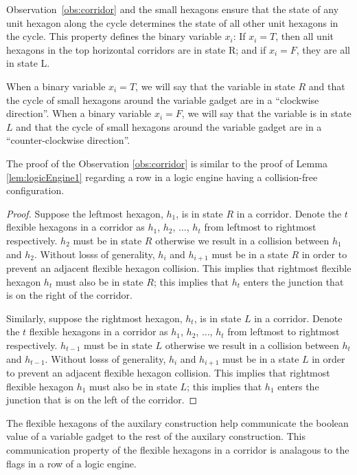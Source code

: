 Observation~\ref{obs:corridor} and the small hexagons ensure that the state of any unit hexagon along the cycle determines the state of all other unit hexagons in the cycle. 
This property defines the binary variable $x_i$: If $x_i=T$, then all unit hexagons in the top horizontal corridors are in state R; and if $x_i=F$, they are all in state L.

When a binary variable $x_i = T$, we will say that the variable in state $R$ and that the cycle of small hexagons around the variable gadget are in a ``clockwise direction''.
When a binary variable $x_i = F$, we will say that the variable is in state $L$ and that the cycle of small hexagons around the variable gadget are in a ``counter-clockwise direction''. 

The proof of the Observation \ref{obs:corridor} is similar to the proof of Lemma \ref{lem:logicEngine1} regarding a row in a logic engine having a collision-free configuration.
\begin{proof}
Suppose the leftmost hexagon, $h_1$, is in state $R$ in a corridor.
Denote the $t$ flexible hexagons in a corridor as $h_1$, $h_2$, $\ldots$, $h_t$ from leftmost to rightmost respectively.
$h_2$ must be in state $R$ otherwise we result in a collision between $h_1$ and $h_2$.
Without losss of generality, $h_i$ and $h_{i+1}$ must be in a state $R$ in order to prevent an adjacent flexible hexagon collision. 
This implies that rightmost flexible hexagon $h_t$ must also be in state $R$; this implies that $h_t$ enters the junction that is on the right of the corridor.

Similarly, suppose the rightmost hexagon, $h_t$, is in state $L$ in a corridor.
Denote the $t$ flexible hexagons in a corridor as $h_1$, $h_2$, $\ldots$, $h_t$ from leftmost to rightmost respectively.
$h_{t-1}$ must be in state $L$ otherwise we result in a collision between $h_t$ and $h_{t-1}$.
Without losss of generality, $h_i$ and $h_{i+1}$ must be in a state $L$ in order to prevent an adjacent flexible hexagon collision. 
This implies that rightmost flexible hexagon $h_1$ must also be in state $L$; this implies that $h_1$ enters the junction that is on the left of the corridor.
\end{proof}
The flexible hexagons of the auxilary construction help communicate the boolean value of a variable gadget to the rest of the auxilary construction.
This communication property of the flexible hexagons in a corridor is analagous to the flags in a row of a logic engine.

